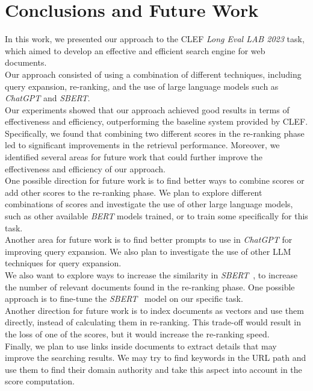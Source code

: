 
\section{Conclusions and Future Work}
\label{sec:conclusion}
 
In this work, we presented our approach to the \ac{CLEF} \textit{Long Eval LAB 2023} task, which aimed to develop an effective and efficient search engine for web documents. \\
Our approach consisted of using a combination of different techniques, including query expansion, re-ranking, and the use of large language models such as \textit{ChatGPT} and \textit{SBERT}. \\
Our experiments showed that our approach achieved good results in terms of effectiveness and efficiency, outperforming the baseline system provided by \ac{CLEF}. Specifically, we found that combining two different scores in the re-ranking phase led to significant improvements in the retrieval performance. Moreover, we identified several areas for future work that could further improve the effectiveness and efficiency of our approach. \\
One possible direction for future work is to find better ways to combine scores or add other scores to the re-ranking phase. We plan to explore different combinations of scores and investigate the use of other large language models, such as other available \textit{BERT} models trained, or to train some specifically for this task. \\
Another area for future work is to find better prompts \cite{wang2023chatgpt} to use in \textit{ChatGPT} for improving query expansion. We also plan to investigate the use of other \ac{LLM} techniques for query expansion. \\
We also want to explore ways to increase the similarity in \textit{SBERT}~\cite{reimers-2019-sentence-bert}, to increase the number of relevant documents found in the re-ranking phase. One possible approach is to fine-tune the \textit{SBERT}~\cite{reimers-2019-sentence-bert} model on our specific task. \\
Another direction for future work is to index documents as vectors and use them directly, instead of calculating them in re-ranking. This trade-off would result in the loss of one of the scores, but it would increase the re-ranking speed. \\
Finally, we plan to use links inside documents to extract details that may improve the searching results. We may try to find keywords in the URL path and use them to find their domain authority and take this aspect into account in the score computation.

